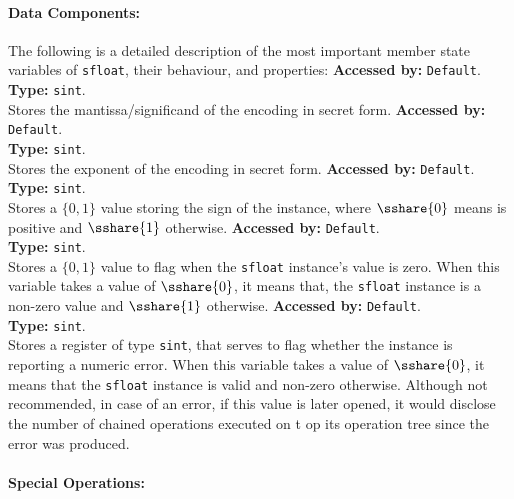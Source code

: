 \paragraph{Data Components:}
The following is a detailed description of the most important member state variables of \verb|sfloat|, their behaviour, and properties:		
		\textbf{Accessed by:} \verb|Default|.\\
		\textbf{Type:} \verb|sint|.\\
		Stores the mantissa/significand of the encoding in secret form.
		\textbf{Accessed by:} \verb|Default|.\\
		\textbf{Type:} \verb|sint|.\\
		Stores the exponent of the encoding in secret form.
		\textbf{Accessed by:} \verb|Default|.\\
		\textbf{Type:} \verb|sint|.\\
		Stores a $\{0,1\}$ value storing the sign of the instance, where $\sshare{0}$ means is positive and $\sshare{1}$ otherwise.		
		\textbf{Accessed by:} \verb|Default|.\\
		\textbf{Type:} \verb|sint|.\\
		Stores a $\{0,1\}$ value to flag when the \verb|sfloat| instance's value is zero. 
		When this variable takes a value of $\sshare{0}$, it means that, the \verb|sfloat| instance is a non-zero value and $\sshare{1}$ otherwise.		
		\textbf{Accessed by:} \verb|Default|.\\
		\textbf{Type:} \verb|sint|.\\
		Stores a register of type \verb|sint|, 
		that serves to flag whether the instance is reporting a numeric error. 
		When this variable takes a value of $\sshare{0}$, 
		it means that the \verb|sfloat| instance is valid and non-zero otherwise. 
		Although not recommended, 
		in case of an error, if this value is later opened, 
		it would disclose the number of chained operations executed on t
		op its operation tree since the error was produced.
		
\paragraph{Special Operations:}

		
